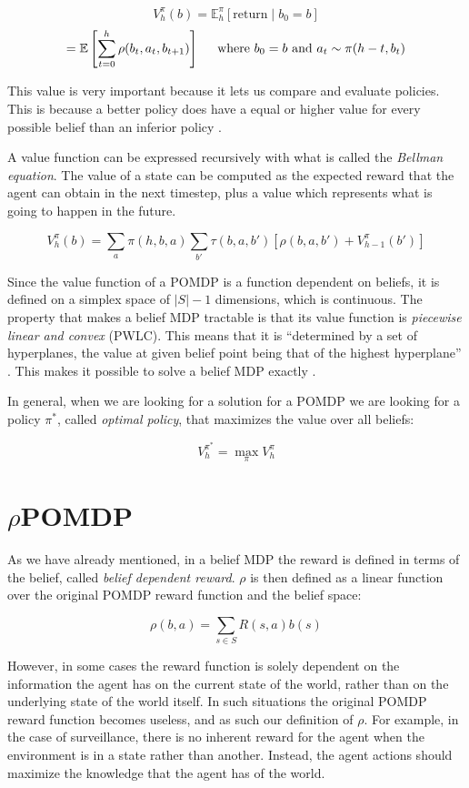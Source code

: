 \[ V^\pi_{h}(b) = \mathbb{E}^\pi_h \left [\text{return} \mid b_0 = b \right ] \]
\[ = \mathbb{E} \left [\sum_{t=0}^{h} \rho(b_{t}, a_t, b_{t+1}) \right ]
    \hspace{0.5cm}\text{where }b_0 = b \text{ and }a_t \sim \pi(h-t, b_t) \]

This value is very important because it lets us compare and evaluate policies. This is because a
better policy does have a equal or higher value for every possible belief than an inferior policy
\cite{cit:suttonbarto}.

A value function can be expressed recursively with what is called  the \textit{Bellman equation}.
The value of a state can be computed as the expected reward that the agent can obtain in the
next timestep, plus a value which represents what is going to happen in the future.

\[ V^{\pi}_{h}(b) = \sum_a \pi(h, b, a) \sum_{b'} \tau(b, a, b') \left [ \rho(b, a, b') +
V^{\pi}_{h-1}(b') \right ] \]

Since the value function of a POMDP is a function dependent on beliefs, it is defined on a simplex
space of $|S|-1$ dimensions, which is continuous. The property that makes a belief MDP tractable is
that its value function is \textit{piecewise linear and convex} (PWLC). This means that it is
``determined by a set of hyperplanes, the value at given belief point being that of the highest
hyperplane'' \cite{cit:rpomdp}. This makes it possible to solve a belief MDP exactly
\cite{cit:pomdp}.

In general, when we are looking for a solution for a POMDP we are looking for a policy $\pi^*$, called
\textit{optimal policy}, that maximizes the value over all beliefs:

\[ V^{\pi^*}_h = \max_\pi V^{\pi}_h \]

\section{$\rho$POMDP}

As we have already mentioned, in a belief MDP the reward is defined in terms of the belief, called
\textit{belief dependent reward}. $\rho$ is then defined as a linear function over the original
POMDP reward function and the belief space:

\[ \rho(b,a) = \sum_{s\in S} R(s,a) b(s) \]

However, in some cases the reward function is solely dependent on the information the agent has on
the current state of the world, rather than on the underlying state of the world itself. In such
situations the original POMDP reward function becomes useless, and as such our definition of $\rho$.
For example, in the case of surveillance, there is no inherent reward for the agent when the
environment is in a state rather than another. Instead, the agent actions should maximize the
knowledge that the agent has of the world.

